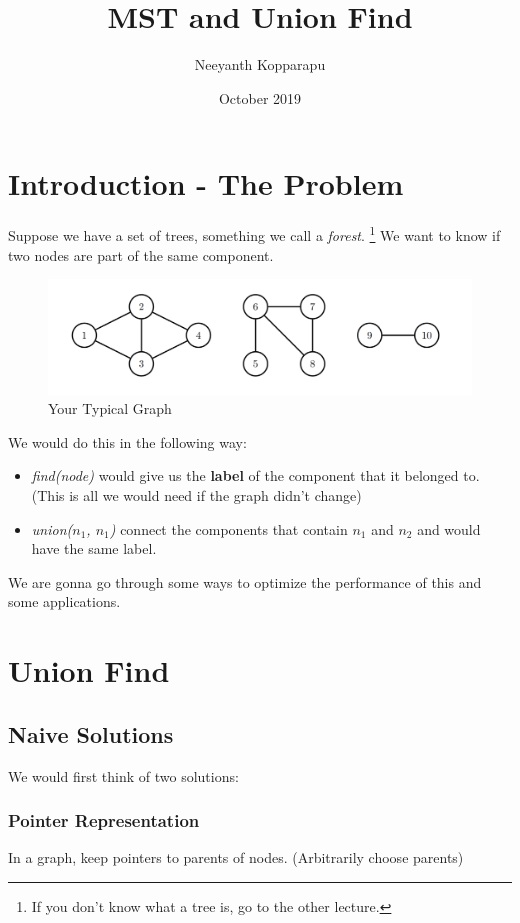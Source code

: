 \documentclass[11pt]{article}
\title{MST and Union Find}
\author{Neeyanth Kopparapu}
\date{October 2019}
\begin{document}
\algrenewcommand{\Return}{\State\algorithmicreturn~}
\maketitle

\section{Introduction - The Problem}
    Suppose we have a set of trees, something we call a \textit{forest}. \footnote{If you don't know what a tree is, go to the other lecture.} We want to know if two nodes are part of the same component. 

\begin{figure}[!hb]
    \centering
    \includegraphics[]{images/graph.png}
    \caption{Your Typical Graph}
    \label{fig:g1}
\end{figure}

    We would do this in the following way:
\begin{itemize}
    \item \textit{find(node)} would give us the \textbf{label} of the component that it belonged to. (This is all we would need if the graph didn't change)
    \item \textit{union($n_1$, $n_1$)} connect the components that contain $n_1$ and $n_2$ and would have the same label.
\end{itemize}

    We are gonna go through some ways to optimize the performance of this and some applications.
\pagebreak
\section{Union Find}
\subsection{Naive Solutions}
We would first think of two solutions:

\subsubsection{Pointer Representation}
    In a graph, keep pointers to parents of nodes. (Arbitrarily choose parents)
\end{document}
